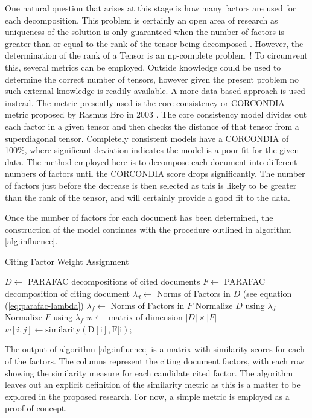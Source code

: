 \documentclass{article}
\begin{document}
One natural question that arises at this stage is how many factors are
used for each decomposition. This problem is certainly an open area of
research as uniqueness of the solution is only guaranteed when the
number of factors is greater than or equal to the rank of the tensor
being decomposed \cite{harshman1970}.  However, the determination of
the rank of a Tensor is an np-complete problem~\cite{haastad1990}!  To
circumvent this, several metrics can be employed.  Outside knowledge
could be used to determine the correct number of tensors, however
given the present problem no such external knowledge is readily
available.  A more data-based approach is used instead.  The metric
presently used is the core-consistency or CORCONDIA metric proposed by
Rasmus Bro in 2003 \cite{bro2003}.  The core consistency model divides
out each factor in a given tensor and then checks the distance of that
tensor from a superdiagonal tensor.  Completely consistent models have
a CORCONDIA of 100\%, where significant deviation indicates the model
is a poor fit for the given data.  The method employed here is to
decompose each document into different numbers of factors until the
CORCONDIA score drops significantly.  The number of factors just
before the decrease is then selected as this is likely to be greater
than the rank of the tensor, and will certainly provide a good fit to
the data.

Once the number of factors for each document has been determined, the
construction of the model continues with the procedure outlined in
algorithm \ref{alg:influence}.  

\begin{algorithm}
    \caption{Citing Factor Weight Assignment}
    \label{alg:influence}
    $D \leftarrow$ PARAFAC decompositions of cited documents\;
    $F \leftarrow$ PARAFAC decomposition of citing document\;
    $\lambda_d \leftarrow $ Norms of Factors in $D$ (see equation
    (\ref{eq:parafac-lambda})\;
    $\lambda_f \leftarrow $ Norms of Factors in $F$\;
    Normalize $D$ using $\lambda_d$\;
    Normalize $F$ using $\lambda_f$\;
    $w \leftarrow $ matrix of dimension $|D| \times |F|$\;
     {
         {
            $w[i,j] \leftarrow \mathrm{similarity(D[i], F[i)}$;
        }
    }
\end{algorithm}

The output of algorithm \ref{alg:influence} is a matrix with similarity
scores for each of the factors. The columns represent the citing
document factors, with each row showing the similarity measure for
each candidate cited factor.  The algorithm leaves out an explicit
definition of the similarity metric as this is a matter to be explored
in the proposed research. For now, a simple metric is employed as
a proof of concept.  
\end{document}
